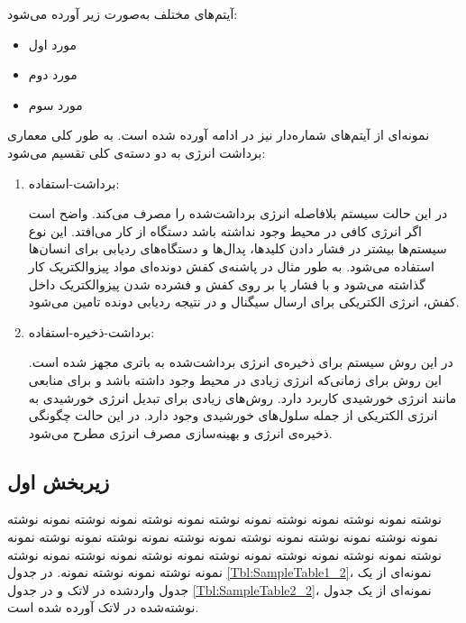 آیتم‌های مختلف به‌صورت زیر آورده می‌شود:
\begin{itemize}[label=-]
\item
مورد اول
\item
مورد دوم
\item
مورد سوم
\end{itemize}

نمونه‌ای از آیتم‌های شماره‌دار نیز در ادامه آورده شده است. به طور کلی معماری برداشت انرژی به دو دسته‌ی کلی تقسیم می‌شود:
\begin{enumerate}[label=\arabic*)]
\item
برداشت-استفاده:

در این حالت سیستم بلافاصله انرژی برداشت‌شده را مصرف می‌کند. واضح است اگر انرژی کافی در محیط وجود نداشته باشد دستگاه از کار می‌افتد. این نوع سیستم‌ها بیشتر در فشار دادن کلید‌ها، پدال‌ها و دستگاه‌های ردیابی برای انسان‌ها استفاده می‌شود. به طور مثال در پاشنه‌ی کفش دونده‌ای مواد پیزوالکتریک کار گذاشته می‌شود و با فشار پا بر روی کفش و فشرده شدن پیزوالکتریک داخل کفش، انرژی الکتریکی برای ارسال سیگنال 
و در نتیجه ردیابی دونده تامین می‌شود. 
\item
برداشت-ذخیره-استفاده:

در این روش سیستم برای ذخیره‌ی انرژی برداشت‌شده به باتری مجهز شده است. این روش برای زمانی‌که انرژی زیادی در محیط وجود داشته باشد و برای منابعی مانند انرژی خورشیدی  کاربرد دارد. روش‌های زیادی برای تبدیل انرژی خورشیدی به انرژی الکتریکی از جمله سلول‌های خورشیدی وجود دارد. در این حالت چگونگی ذخیره‌ی انرژی و بهینه‌سازی مصرف انرژی مطرح می‌شود.
\end{enumerate}




\subsection{زیربخش اول}
نوشته نمونه نوشته نمونه نوشته نمونه نوشته نمونه نوشته نمونه نوشته نمونه نوشته نمونه نوشته نمونه نوشته نمونه نوشته نمونه نوشته نمونه نوشته نمونه نوشته نمونه نوشته نمونه نوشته نمونه نوشته نمونه نوشته نمونه نوشته نمونه نوشته نمونه نوشته نمونه نوشته نمونه نوشته نمونه. در جدول
\ref{Tbl:SampleTable1_2}،
نمونه‌ای از یک جدول واردشده در لاتک و در جدول
\ref{Tbl:SampleTable2_2}،
نمونه‌ای از یک جدول نوشته‌شده در لاتک آورده شده است.

